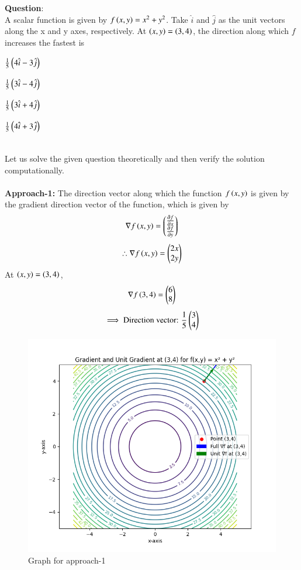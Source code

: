 \documentclass[journal]{IEEEtran}
\begin{document}
\textbf{Question}:\\
A scalar function is given by $f\left(x,y\right)=x^2+y^2$. Take $\hat{i}$ and $\hat{j}$ as the unit vectors along the x and y axes, respectively. At $\left(x,y\right)=\left(3,4\right)$, the direction along which $f$ increases the fastest is
\begin{enumerate}
\begin{multicols}{4}
    \item $\frac{1}{5}\left(4\hat{i}-3\hat{j}\right)$
    \item $\frac{1}{5}\left(3\hat{i}-4\hat{j}\right)$
    \item $\frac{1}{5}\left(3\hat{i}+4\hat{j}\right)$
    \item $\frac{1}{5}\left(4\hat{i}+3\hat{j}\right)$
\end{multicols}
\end{enumerate}
\solution \\
Let us solve the given question theoretically and then verify the solution computationally.\\
\\
\textbf{Approach-1:}
The direction vector along which the function $f\left(x,y\right)$ is given by the gradient direction vector of the function, which is given by
\begin{align}
    \nabla f\left(x,y\right)=\begin{pmatrix}\tfrac{\partial f}{\partial x}\\\tfrac{\partial f}{\partial y}\end{pmatrix}
\end{align}
\begin{align}
    \therefore \nabla f\left(x,y\right)=\begin{pmatrix}2x\\2y\end{pmatrix}
\end{align}
At $\left(x,y\right)=\left(3,4\right)$,
\begin{align}
    \nabla f\left(3,4\right)=\begin{pmatrix}6\\8\end{pmatrix}
\end{align}
\begin{align}
    \implies \text{Direction vector: }\frac{1}{5}\begin{pmatrix}3\\4\end{pmatrix}
\end{align}
\newpage
\vspace*{0.25cm}
\begin{figure}[H]
    \centering
    \includegraphics[width=0.7\columnwidth]{figs/Figure_1.png}
    \caption{Graph for approach-1}
    \label{fig:1}
\end{figure}
\end{document}
